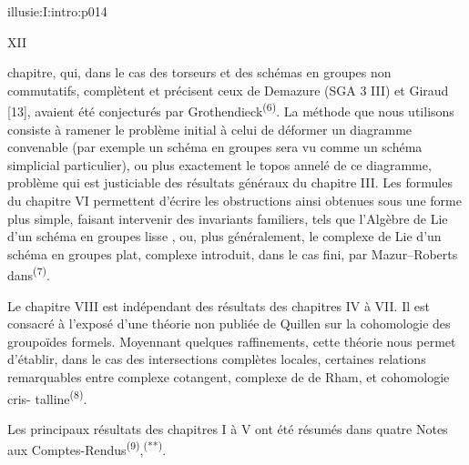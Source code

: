 \IllusieSetPhysicalPageSize{447bp}{698.6bp}
\begin{illusiefrontpage}{illusie:I:intro:p014}{}
\begin{center}\fontsize{10}{12}\selectfont XII\end{center}
\vspace{12bp}
\hypertarget{illusie:I:intro:p014:p1}{}%
chapitre, qui, dans le cas des torseurs et des schémas en groupes non commutatifs,
complètent et précisent ceux de Demazure (SGA 3 III) et Giraud [13], avaient été
conjecturés par Grothendieck\textsuperscript{(6)}. La méthode que nous utilisons
consiste à ramener le problème initial à celui de déformer un diagramme convenable
(par exemple un schéma en groupes sera vu comme un schéma simplicial particulier),
ou plus exactement le topos annelé de ce diagramme, problème qui est justiciable
des résultats généraux du chapitre III. Les formules du chapitre VI permettent
d'écrire les obstructions ainsi obtenues sous une forme plus simple, faisant
intervenir des invariants familiers, tels que l'Algèbre de Lie d'un schéma en
groupes lisse , ou, plus généralement, le complexe de Lie d'un schéma en groupes
plat, complexe introduit, dans le cas fini, par Mazur--Roberts
dans\textsuperscript{(7)}.

\vspace{4bp}
\hypertarget{illusie:I:intro:p014:p2}{}%
Le chapitre VIII est indépendant des résultats des chapitres IV à VII. Il est
consacré à l'exposé d'une théorie non publiée de Quillen sur la cohomologie des
groupoïdes formels. Moyennant quelques raffinements, cette théorie nous permet
d'établir, dans le cas des intersections complètes locales, certaines relations
remarquables entre complexe cotangent, complexe de de Rham, et cohomologie cris-\linebreak
talline\textsuperscript{(8)}.

\vspace{4bp}
\hypertarget{illusie:I:intro:p014:p3}{}%
Les principaux résultats des chapitres I à V ont été résumés dans quatre Notes aux
Comptes-Rendus\textsuperscript{(9)},\textsuperscript{(**)}.


\end{illusiefrontpage}
